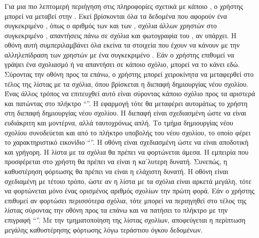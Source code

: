 \subsubsection{}
Για μια πιο λεπτομερή περιήγηση στις πληροφορίες σχετικά με κάποιο , ο χρήστης μπορεί να μεταβεί στην . Εκεί βρίσκονται όλα τα δεδομένα που αφορούν ένα συγκεκριμένο , όπως ο αριθμός των  και των , σχόλια άλλων χρηστών στο συγκεκριμένο , απαντήσεις πάνω σε σχόλια και φωτογραφία του , αν υπάρχει. \newline
\indent
Η οθόνη αυτή συμπεριλαμβάνει όλα εκείνα τα στοιχεία που έχουν να κάνουν με την αλληλεπίδραση των χρηστών με ένα συγκεκριμένο . Εάν ο χρήστης επιθυμεί να γράψει ένα σχολιασμό ή να απαντήσει σε κάποιο σχόλιο, μπορεί να το κάνει εδώ. Σύροντας την οθόνη προς τα επάνω, ο χρήστης μπορεί χειροκίνητα να μεταφερθεί στο τέλος της λίστας με τα σχόλια, όπου βρίσκεται η διεπαφή δημιουργίας νέου σχολίου. Ένας άλλος τρόπος να επιτευχθεί αυτό είναι σύροντας κάποιο σχόλιο προς τα αριστερά και πατώντας στο πλήκτρο ``\textit{}''. Η εφαρμογή τότε θα μεταφέρει αυτομάτως το χρήστη στη διεπαφή δημιουργίας νέου σχολίου. Η διεπαφή είναι σχεδιασμένη ώστε να είναι ευδιάκριτη και μοντέρνα, αλλά ταυτοχρόνως απλή. Το τμήμα δημιουργίας νέου σχολίου συνοδεύεται και από το πλήκτρο υποβολής του νέου σχολίου, το οποίο φέρει το χαρακτηριστικό εικονίδιο ``\textit{}''.
\newline
\indent
Η οθόνη είναι σχεδιασμένη ώστε να είναι αποδοτική και γρήγορη. Η λίστα με τα σχόλια θα πρέπει να φορτώνεται άμεσα. Η εμπειρία που προσφέρεται στο χρήστη θα πρέπει να είναι η κα΄λυτερη δυνατή. Συνεπώς, η καθυστέρηση φόρτωσης θα πρέπει να είναι η ελάχιστη δυνατή. Η οθόνη είναι σχεδιαμένη με τέτοιο τρόπο, ώστε αν η λίστα με τα σχόλια είναι αρκετά μεγάλη, τότε να φορτώνεται μόνο ένας ορισμένος αριθμός σχολίων την πρώτη φορά. Εάν ο χρήστης επιθυμεί αν φορτώσει περισσότερα σχόλια, τότε μπορεί να περιηγηθεί στο τέλος της λίστας σύροντας την οθόνη προς τα επάνω και να πατήσει το πλήκτρο με την επιγραφή ``\textit{}''. Με την τμηματοποίηση της λίστας σχολίων, αποφεύγεται η περίπτωση μεγάλης καθυστέρησης φόρτωσης λόγω τεράστιου όγκου δεδομένων.


